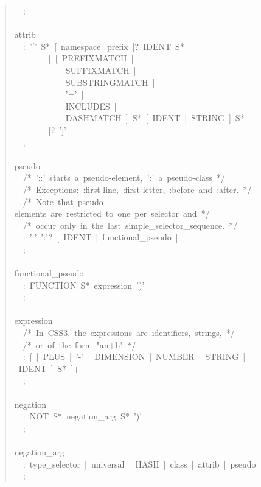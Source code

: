 \begin{quote}
{~~;~\\
~\\
attrib~\\
~~:~'{[}'~S*~{[}~namespace{\_}prefix~{]}?~IDENT~S*~\\
~~~~~~~~{[}~{[}~PREFIXMATCH~|~\\
~~~~~~~~~~~~SUFFIXMATCH~|~\\
~~~~~~~~~~~~SUBSTRINGMATCH~|~\\
~~~~~~~~~~~~'='~|~\\
~~~~~~~~~~~~INCLUDES~|~\\
~~~~~~~~~~~~DASHMATCH~{]}~S*~{[}~IDENT~|~STRING~{]}~S*~\\
~~~~~~~~{]}?~'{]}'~\\
~~;~\\
~\\
pseudo~\\
~~/*~'::'~starts~a~pseudo-element,~':'~a~pseudo-class~*/~\\
~~/*~Exceptions:~:first-line,~:first-letter,~:before~and~:after.~*/~\\
~~/*~Note~that~pseudo-elements~are~restricted~to~one~per~selector~and~*/~\\
~~/*~occur~only~in~the~last~simple{\_}selector{\_}sequence.~*/~\\
~~:~':'~':'?~{[}~IDENT~|~functional{\_}pseudo~{]}~\\
~~;~\\
~\\
functional{\_}pseudo~\\
~~:~FUNCTION~S*~expression~')'~\\
~~;~\\
~\\
expression~\\
~~/*~In~CSS3,~the~expressions~are~identifiers,~strings,~*/~\\
~~/*~or~of~the~form~"an+b"~*/~\\
~~:~{[}~{[}~PLUS~|~'-'~|~DIMENSION~|~NUMBER~|~STRING~|~IDENT~{]}~S*~{]}+~\\
~~;~\\
~\\
negation~\\
~~:~NOT~S*~negation{\_}arg~S*~')'~\\
~~;~\\
~\\
negation{\_}arg~\\
~~:~type{\_}selector~|~universal~|~HASH~|~class~|~attrib~|~pseudo~\\
~~;
}\end{quote}

